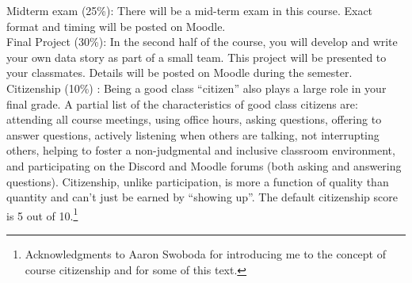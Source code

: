 \documentclass[10pt]{article}
\begin{document}
\noindent Midterm exam (25\%): There will be a mid-term exam in this course. Exact format and timing will be posted on Moodle. \\

\noindent Final Project (30\%): In the second half of the course, you will develop and write your own data story as part of a small team. This project will be presented to your classmates. Details will be posted on Moodle during the semester. \\


\noindent Citizenship (10\%) : Being a good class ``citizen'' also plays a large role in your final grade. A partial list of the characteristics of good class citizens are: attending all course meetings, using office hours, asking questions, offering to answer questions, actively listening when others are talking, not interrupting others, helping to foster a non-judgmental and inclusive classroom environment, and participating on the Discord and Moodle forums (both asking and answering questions). Citizenship, unlike participation, is more a function of quality than quantity and can't just be earned by ``showing up''. The default citizenship score is 5 out of 10.\footnote{Acknowledgments to Aaron Swoboda for introducing me to the concept of course citizenship and for some of this text.} \\


\end{document}
